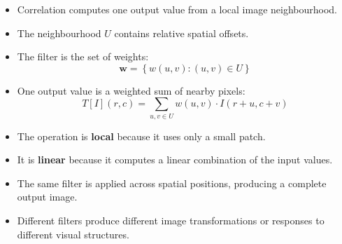 \newpage

\begin{takeawaysbox}
    \begin{itemize}
        \item Correlation computes one output value from a local image neighbourhood.
        \item The neighbourhood $U$ contains relative spatial offsets.
        \item The filter is the set of weights:
        \begin{equation*}
            \mathbf{w} = \left\{w(u,v) : (u,v) \in U\right\}
        \end{equation*}
        \item One output value is a weighted sum of nearby pixels:
        \begin{equation*}
            T[I](r,c) = \sum_{u,v \in U} w(u,v) \cdot I(r+u, c+v)
        \end{equation*}
        \item The operation is \textbf{local} because it uses only a small patch.
        \item It is \textbf{linear} because it computes a linear combination of the input values.
        \item The same filter is applied across spatial positions, producing a complete output image.
        \item Different filters produce different image transformations or responses to different visual structures.
    \end{itemize}
\end{takeawaysbox}